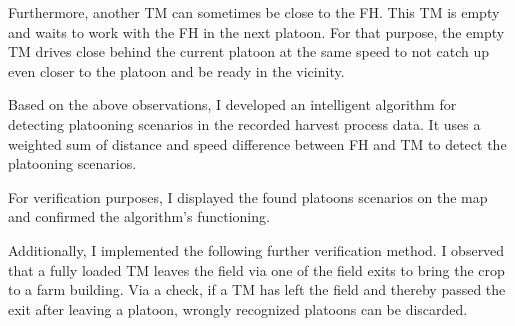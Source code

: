 Furthermore, another \ac{TM} can sometimes be close to the \ac{FH}. This \ac{TM} is empty and waits to work with the \ac{FH} in the next platoon. For that purpose, the empty \ac{TM} drives close behind the current platoon at the same speed to not catch up even closer to the platoon and be ready in the vicinity.

Based on the above observations, I developed an intelligent algorithm for detecting platooning scenarios in the recorded harvest process data. It uses a weighted sum of distance and speed difference between \ac{FH} and \ac{TM} to detect the platooning scenarios.

For verification purposes, I displayed the found platoons scenarios on the map and confirmed the algorithm's functioning. 

Additionally, I implemented the following further verification method. 
I observed that a fully loaded \ac{TM} leaves the field via one of the field exits to bring the crop to a farm building. Via a check, if a \ac{TM} has left the field and thereby passed the exit after leaving a platoon, wrongly recognized platoons can be discarded.


